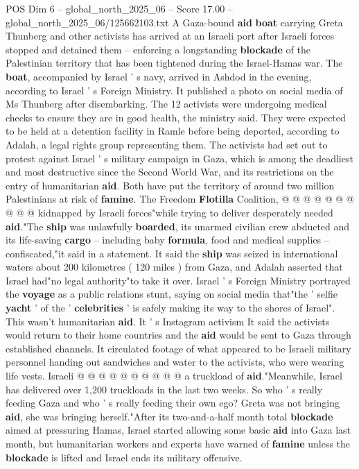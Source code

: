 \begin{textsample}{POS Dim 6 – global\_north\_2025\_06 – Score 17.00 – global\_north\_2025\_06/125662103.txt}  \label{ex:f6_pos_024}
A Gaza-bound \textbf{aid} \textbf{boat} carrying Greta Thunberg and other activists has arrived at an Israeli port after Israeli forces stopped and detained them -- enforcing a longstanding \textbf{blockade} of the Palestinian territory that has been tightened during the Israel-Hamas war.
The \textbf{boat}, accompanied by Israel ' s navy, arrived in Ashdod in the evening, according to Israel ' s Foreign Ministry.
It published a photo on social media of Ms Thunberg after disembarking.
The 12 activists were undergoing medical checks to ensure they are in good health, the ministry said.
They were expected to be held at a detention facility in Ramle before being deported, according to Adalah, a legal rights group representing them.
The activists had set out to protest against Israel ' s military campaign in Gaza, which is among the deadliest and most destructive since the Second World War, and its restrictions on the entry of humanitarian \textbf{aid}.
Both have put the territory of around two million Palestinians at risk of \textbf{famine}.
The Freedom \textbf{Flotilla} Coalition, @ @ @ @ @ @ @ @ @ @ kidnapped by Israeli forces"while trying to deliver desperately needed \textbf{aid}."The \textbf{ship} was unlawfully \textbf{boarded}, its unarmed civilian crew abducted and its life-saving \textbf{cargo} -- including baby \textbf{formula}, food and medical supplies -- confiscated,"it said in a statement.
It said the \textbf{ship} was seized in international waters about 200 kilometres ( 120 miles ) from Gaza, and Adalah asserted that Israel had"no legal authority"to take it over.
Israel ' s Foreign Ministry portrayed the \textbf{voyage} as a public relations stunt, saying on social media that"the ' selfie \textbf{yacht} ' of the ' \textbf{celebrities} ' is safely making its way to the shores of Israel".
This wasn't humanitarian \textbf{aid}.
It ' s Instagram activism It said the activists would return to their home countries and the \textbf{aid} would be sent to Gaza through established channels.
It circulated footage of what appeared to be Israeli military personnel handing out sandwiches and water to the activists, who were wearing life vests.
Israeli @ @ @ @ @ @ @ @ @ @ a truckload of \textbf{aid}."Meanwhile, Israel has delivered over 1,200 truckloads in the last two weeks.
So who ' s really feeding Gaza and who ' s really feeding their own ego?
Greta was not bringing \textbf{aid}, she was bringing herself."After its two-and-a-half month total \textbf{blockade} aimed at pressuring Hamas, Israel started allowing some basic \textbf{aid} into Gaza last month, but humanitarian workers and experts have warned of \textbf{famine} unless the \textbf{blockade} is lifted and Israel ends its military offensive.

\end{textsample}
